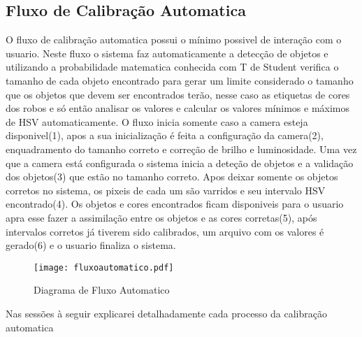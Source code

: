 	\subsection{Fluxo de Calibração Automatica}	
	O fluxo de calibração automatica possui o mínimo possivel de interação com o usuario. Neste fluxo o sistema faz automaticamente a detecção de objetos e utilizando a probabilidade matematica conhecida com T de Student verifica o tamanho de cada objeto encontrado para gerar um limite considerado o tamanho que os objetos que devem ser encontrados terão, nesse caso as etiquetas de cores dos robos e só então analisar os valores e calcular os valores mínimos e máximos de HSV automaticamente.	
	O fluxo inicia somente caso a camera esteja disponivel(1), apos a sua inicialização é feita a configuração da camera(2), enquadramento do tamanho correto e correção de brilho e luminosidade. Uma vez que a camera está configurada o sistema inicia a deteção de objetos e a validação dos objetos(3) que estão no tamanho correto. Apos deixar somente os objetos corretos no sistema, os pixeis de cada um são varridos e seu intervalo HSV encontrado(4). Os objetos e cores encontrados ficam disponiveis para o usuario apra esse fazer a assimilação entre os objetos e as cores corretas(5), após intervalos corretos já tiverem sido calibrados, um arquivo com os valores é gerado(6) e o usuario finaliza o sistema.
		\begin{figure}[!h]
				\centering
				\texttt{[image: fluxoautomatico.pdf]}
				\caption{Diagrama de Fluxo Automatico}
				\label{DiagramaDeFluxoAutomatico}
			\end{figure} 
			
		Nas sessões à seguir explicarei detalhadamente cada processo da calibração automatica
